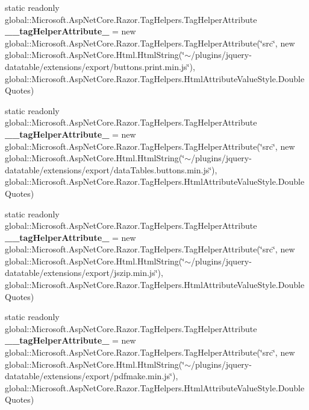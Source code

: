 \begin{DoxyCompactItemize}
\item 
\mbox{\label{class_asp_net_core_1_1_views___items___index_a52058c13cfa386cb60d890a52190f73d}} 
static readonly global\+::\+Microsoft.\+Asp\+Net\+Core.\+Razor.\+Tag\+Helpers.\+Tag\+Helper\+Attribute {\bfseries \+\_\+\+\_\+tag\+Helper\+Attribute\+\_} = new global\+::\+Microsoft.\+Asp\+Net\+Core.\+Razor.\+Tag\+Helpers.\+Tag\+Helper\+Attribute(\char`\"{}src\char`\"{}, new global\+::\+Microsoft.\+Asp\+Net\+Core.\+Html.\+Html\+String(\char`\"{}$\sim$/plugins/jquery-\/datatable/extensions/export/buttons.\+print.\+min.\+js\char`\"{}), global\+::\+Microsoft.\+Asp\+Net\+Core.\+Razor.\+Tag\+Helpers.\+Html\+Attribute\+Value\+Style.\+Double\+Quotes)
\item 
\mbox{\label{class_asp_net_core_1_1_views___items___index_adebd92d0b31fd35bb49bdec94ee7f274}} 
static readonly global\+::\+Microsoft.\+Asp\+Net\+Core.\+Razor.\+Tag\+Helpers.\+Tag\+Helper\+Attribute {\bfseries \+\_\+\+\_\+tag\+Helper\+Attribute\+\_} = new global\+::\+Microsoft.\+Asp\+Net\+Core.\+Razor.\+Tag\+Helpers.\+Tag\+Helper\+Attribute(\char`\"{}src\char`\"{}, new global\+::\+Microsoft.\+Asp\+Net\+Core.\+Html.\+Html\+String(\char`\"{}$\sim$/plugins/jquery-\/datatable/extensions/export/data\+Tables.\+buttons.\+min.\+js\char`\"{}), global\+::\+Microsoft.\+Asp\+Net\+Core.\+Razor.\+Tag\+Helpers.\+Html\+Attribute\+Value\+Style.\+Double\+Quotes)
\item 
\mbox{\label{class_asp_net_core_1_1_views___items___index_af2e0bc8ab1bac1cdef23f040eaaaf0e5}} 
static readonly global\+::\+Microsoft.\+Asp\+Net\+Core.\+Razor.\+Tag\+Helpers.\+Tag\+Helper\+Attribute {\bfseries \+\_\+\+\_\+tag\+Helper\+Attribute\+\_} = new global\+::\+Microsoft.\+Asp\+Net\+Core.\+Razor.\+Tag\+Helpers.\+Tag\+Helper\+Attribute(\char`\"{}src\char`\"{}, new global\+::\+Microsoft.\+Asp\+Net\+Core.\+Html.\+Html\+String(\char`\"{}$\sim$/plugins/jquery-\/datatable/extensions/export/jszip.\+min.\+js\char`\"{}), global\+::\+Microsoft.\+Asp\+Net\+Core.\+Razor.\+Tag\+Helpers.\+Html\+Attribute\+Value\+Style.\+Double\+Quotes)
\item 
\mbox{\label{class_asp_net_core_1_1_views___items___index_a95c0e096852a8bc411993d84cdfa157a}} 
static readonly global\+::\+Microsoft.\+Asp\+Net\+Core.\+Razor.\+Tag\+Helpers.\+Tag\+Helper\+Attribute {\bfseries \+\_\+\+\_\+tag\+Helper\+Attribute\+\_} = new global\+::\+Microsoft.\+Asp\+Net\+Core.\+Razor.\+Tag\+Helpers.\+Tag\+Helper\+Attribute(\char`\"{}src\char`\"{}, new global\+::\+Microsoft.\+Asp\+Net\+Core.\+Html.\+Html\+String(\char`\"{}$\sim$/plugins/jquery-\/datatable/extensions/export/pdfmake.\+min.\+js\char`\"{}), global\+::\+Microsoft.\+Asp\+Net\+Core.\+Razor.\+Tag\+Helpers.\+Html\+Attribute\+Value\+Style.\+Double\+Quotes)

\end{DoxyCompactItemize}
